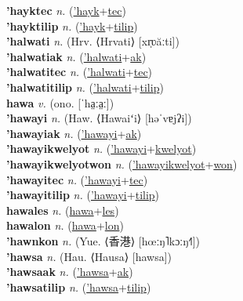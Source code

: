 \textbf{'hayktec} \textit{n.} (\hyperref['hayk]{'hayk}+\hyperref[tec]{tec})
 \label{'hayktec} \\
\textbf{'hayktilip} \textit{n.} (\hyperref['hayk]{'hayk}+\hyperref[tilip]{tilip})
 \label{'hayktilip} \\
\textbf{'halwati} \textit{n.} (Hrv. ⟨Hrvati⟩ [xr̩ʋăːti])
 \label{'halwati} \\
\textbf{'halwatiak} \textit{n.} (\hyperref['halwati]{'halwati}+\hyperref[ak]{ak})
 \label{'halwatiak} \\
\textbf{'halwatitec} \textit{n.} (\hyperref['halwati]{'halwati}+\hyperref[tec]{tec})
 \label{'halwatitec} \\
\textbf{'halwatitilip} \textit{n.} (\hyperref['halwati]{'halwati}+\hyperref[tilip]{tilip})
 \label{'halwatitilip} \\
\textbf{hawa} \textit{v.} (ono. [ˈha̤ːa̤ː])
 \label{hawa} \\
\textbf{'hawayi} \textit{n.} (Haw. ⟨Hawaiʻi⟩ [həˈvɐjʔi])
 \label{'hawayi} \\
\textbf{'hawayiak} \textit{n.} (\hyperref['hawayi]{'hawayi}+\hyperref[ak]{ak})
 \label{'hawayiak} \\
\textbf{'hawayikwelyot} \textit{n.} (\hyperref['hawayi]{'hawayi}+\hyperref[kwelyot]{kwelyot})
 \label{'hawayikwelyot} \\
\textbf{'hawayikwelyotwon} \textit{n.} (\hyperref['hawayikwelyot]{'hawayikwelyot}+\hyperref[won]{won})
 \label{'hawayikwelyotwon} \\
\textbf{'hawayitec} \textit{n.} (\hyperref['hawayi]{'hawayi}+\hyperref[tec]{tec})
 \label{'hawayitec} \\
\textbf{'hawayitilip} \textit{n.} (\hyperref['hawayi]{'hawayi}+\hyperref[tilip]{tilip})
 \label{'hawayitilip} \\
\textbf{hawales} \textit{n.} (\hyperref[hawa]{hawa}+\hyperref[les]{les})
 \label{hawales} \\
\textbf{hawalon} \textit{n.} (\hyperref[hawa]{hawa}+\hyperref[lon]{lon})
 \label{hawalon} \\
\textbf{'hawnkon} \textit{n.} (Yue. ⟨香港⟩ [hœːŋ˥kɔːŋ˧˥])
 \label{'hawnkon} \\
\textbf{'hawsa} \textit{n.} (Hau. ⟨Hausa⟩ [hawsa])
 \label{'hawsa} \\
\textbf{'hawsaak} \textit{n.} (\hyperref['hawsa]{'hawsa}+\hyperref[ak]{ak})
 \label{'hawsaak} \\
\textbf{'hawsatilip} \textit{n.} (\hyperref['hawsa]{'hawsa}+\hyperref[tilip]{tilip})
 \label{'hawsatilip} \\
